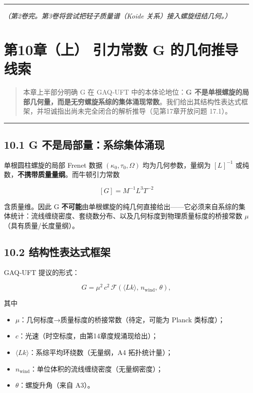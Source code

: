 \begin{center}\rule{0.5\linewidth}{0.5pt}\end{center}

\emph{（第2卷完。第3卷将尝试把轻子质量谱（Koide
关系）接入螺旋纽结几何。）}

\section{第10章（上） 引力常数 G
的几何推导线索}\label{ux7b2c10ux7ae0ux4e0a-ux5f15ux529bux5e38ux6570-g-ux7684ux51e0ux4f55ux63a8ux5bfcux7ebfux7d22}

\begin{quote}
本章上半部分明确 G 在 GAQ‑UFT 中的本体论地位：\textbf{G
不是单根螺旋的局部几何量，而是无穷螺旋系综的集体涌现常数}。我们给出其结构性表达式框架，并坦诚指出尚未完全闭合的解析推导（见第17章开放问题
17.1）。
\end{quote}

\begin{center}\rule{0.5\linewidth}{0.5pt}\end{center}

\subsection{10.1 G
不是局部量：系综集体涌现}\label{g-ux4e0dux662fux5c40ux90e8ux91cfux7cfbux7efcux96c6ux4f53ux6d8cux73b0}

单根圆柱螺旋的局部 Frenet 数据 \((\kappa_0,\tau_0,\Omega)\)
均为几何参数，量纲为 \([L]^{-1}\)
或纯数，\textbf{不携带质量量纲}。而牛顿引力常数

\[
[G]=M^{-1}L^3T^{-2}
\]

含质量维。因此 G
\textbf{不可能}由单根螺旋的纯几何直接给出------它必须来自系综的集体统计：流线缠绕密度、套绕数分布、以及几何标度到物理质量标度的桥接常数
\(\mu\)（具有质量/长度量纲）。

\subsection{10.2
结构性表达式框架}\label{ux7ed3ux6784ux6027ux8868ux8fbeux5f0fux6846ux67b6}

GAQ‑UFT 提议的形式：

\[
G = \mu^2\,c^2\,\mathcal{F}\!\left(\langle Lk\rangle,\,n_{\mathrm{wind}},\,\theta\right),
\]

其中

\begin{itemize}
\tightlist
\item
  \(\mu\)：几何标度→质量标度的桥接常数（待定，可能为 Planck 类标度）；
\item
  \(c\)：光速（时空标度，由第14章度规涌现给出）；
\item
  \(\langle Lk\rangle\)：系综平均环绕数（无量纲，A4 拓扑统计量）；
\item
  \(n_{\mathrm{wind}}\)：单位体积的流线缠绕密度（无量纲密度）；
\item
  \(\theta\)：螺旋升角（来自 A3）。
\end{itemize}

